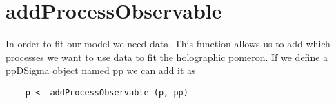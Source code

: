 \documentclass{book}
\begin{document}
\section{addProcessObservable}
In order to fit our model we need data. This function allows us to add which processes we want to use data to fit the holographic pomeron. If we define a ppDSigma object named pp we can add it as
\begin{lstlisting}
    p <- addProcessObservable (p, pp)
\end{lstlisting}
\end{document}
